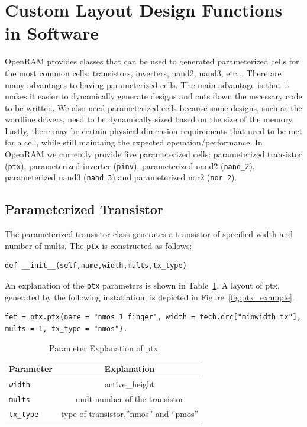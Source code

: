 \section{Custom Layout Design Functions in Software}
\label{sec:parameterized}

OpenRAM provides classes that can be used to generated parameterized
cells for the most common cells: transistors, inverters, nand2, nand3, etc...  
There are many advantages to having parameterized cells.
The main advantage is that it makes it easier to dynamically generate designs and cuts
down the necessary code to be written.  
We also need parameterized cells because some designs, such as the wordline drivers, need to be
dynamically sized based on the size of the memory. 
Lastly, there may be certain physical dimension requirements that need to be met for a
cell, while still maintaing the expected operation/performance.  
In OpenRAM we currently provide five parameterized cells: parameterized
transistor (\verb|ptx|), parameterized inverter (\verb|pinv|), parameterized nand2 (\verb|nand_2|), 
parameterized nand3 (\verb|nand_3|) and parameterized nor2 (\verb|nor_2|). 


\subsection{Parameterized Transistor}
\label{sec:ptx}

The parameterized transistor class generates a transistor of specified
width and number of mults.
The \verb|ptx| is constructed as follows:
\begin{verbatim}
def __init__(self,name,width,mults,tx_type)
\end{verbatim} 

An explanation of the \verb|ptx| parameters is shown in
Table~\ref{table:ptx_params}. A layout of ptx, generated by the
following instatiation, is depicted in Figure~\ref{fig:ptx_example}.
\begin{verbatim}
fet = ptx.ptx(name = "nmos_1_finger", width = tech.drc["minwidth_tx"], 
mults = 1, tx_type = "nmos").
\end{verbatim}

\begin{table}[h!] 
  \begin{center}
    \begin{tabular}{| l | c |}
    \hline
    Parameter & Explanation  \\ \hline
    \verb|width| & active\_height \\ \hline
    \verb|mults| & mult number of the transistor \\ \hline
    \verb|tx_type| & type of transistor,”nmos” and “pmos” \\ \hline
    \hline
    \end{tabular}
  \end{center}
  \caption{Parameter Explanation of ptx}
  \label{table:ptx_params}
\end{table}



